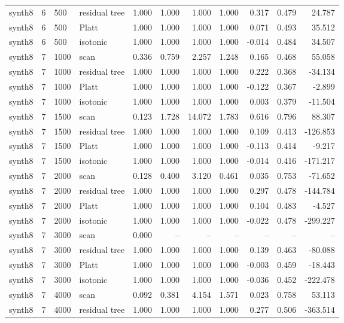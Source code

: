\begin{tabular}{lrllrrrrrrr}
synth8 & 6 & 500 & residual tree & 1.000 & 1.000 & 1.000 & 1.000 & 0.317 & 0.479 & 24.787 \\
synth8 & 6 & 500 & Platt & 1.000 & 1.000 & 1.000 & 1.000 & 0.071 & 0.493 & 35.512 \\
synth8 & 6 & 500 & isotonic & 1.000 & 1.000 & 1.000 & 1.000 & -0.014 & 0.484 & 34.507 \\
synth8 & 7 & 1000 & scan & 0.336 & 0.759 & 2.257 & 1.248 & 0.165 & 0.468 & 55.058 \\
synth8 & 7 & 1000 & residual tree & 1.000 & 1.000 & 1.000 & 1.000 & 0.222 & 0.368 & -34.134 \\
synth8 & 7 & 1000 & Platt & 1.000 & 1.000 & 1.000 & 1.000 & -0.122 & 0.367 & -2.899 \\
synth8 & 7 & 1000 & isotonic & 1.000 & 1.000 & 1.000 & 1.000 & 0.003 & 0.379 & -11.504 \\
synth8 & 7 & 1500 & scan & 0.123 & 1.728 & 14.072 & 1.783 & 0.616 & 0.796 & 88.307 \\
synth8 & 7 & 1500 & residual tree & 1.000 & 1.000 & 1.000 & 1.000 & 0.109 & 0.413 & -126.853 \\
synth8 & 7 & 1500 & Platt & 1.000 & 1.000 & 1.000 & 1.000 & -0.113 & 0.414 & -9.217 \\
synth8 & 7 & 1500 & isotonic & 1.000 & 1.000 & 1.000 & 1.000 & -0.014 & 0.416 & -171.217 \\
synth8 & 7 & 2000 & scan & 0.128 & 0.400 & 3.120 & 0.461 & 0.035 & 0.753 & -71.652 \\
synth8 & 7 & 2000 & residual tree & 1.000 & 1.000 & 1.000 & 1.000 & 0.297 & 0.478 & -144.784 \\
synth8 & 7 & 2000 & Platt & 1.000 & 1.000 & 1.000 & 1.000 & 0.104 & 0.483 & -4.527 \\
synth8 & 7 & 2000 & isotonic & 1.000 & 1.000 & 1.000 & 1.000 & -0.022 & 0.478 & -299.227 \\
synth8 & 7 & 3000 & scan & 0.000 & -- & -- & -- & -- & -- & -- \\
synth8 & 7 & 3000 & residual tree & 1.000 & 1.000 & 1.000 & 1.000 & 0.139 & 0.463 & -80.088 \\
synth8 & 7 & 3000 & Platt & 1.000 & 1.000 & 1.000 & 1.000 & -0.003 & 0.459 & -18.443 \\
synth8 & 7 & 3000 & isotonic & 1.000 & 1.000 & 1.000 & 1.000 & -0.036 & 0.452 & -222.478 \\
synth8 & 7 & 4000 & scan & 0.092 & 0.381 & 4.154 & 1.571 & 0.023 & 0.758 & 53.113 \\
synth8 & 7 & 4000 & residual tree & 1.000 & 1.000 & 1.000 & 1.000 & 0.277 & 0.506 & -363.514 \\

\end{tabular}
